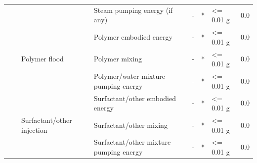 \documentclass[11pt]{report}
\begin{document}
\begin{landscape}
\begin{table}
\begin{scriptsize}
\begin{tabular}{|p{}|p{}|p{}|p{}|p{}|p{}|p{}|p{}|}
\cline{4-8}
& & & Steam pumping energy (if any) & - & * & <= 0.01 g & 0.0\\
\cline{3-8}
& & \multirow{3}{*}{Polymer flood} & Polymer embodied energy & - & * & <= 0.01 g & 0.0\\
\cline{4-8}
& & & Polymer mixing & - & * & <= 0.01 g & 0.0\\
\cline{4-8}
& & & Polymer/water mixture pumping energy & - & * & <= 0.01 g & 0.0\\
\cline{3-8}
& & \multirow{3}{0.12\columnwidth}{Surfactant/other injection} & Surfactant/other embodied energy & - & * & <= 0.01 g & 0.0\\
\cline{4-8}
& & & Surfactant/other mixing & - & * & <= 0.01 g & 0.0\\
\cline{4-8}
& & & Surfactant/other mixture pumping energy & - & * & <= 0.01 g & 0.0\\
\hline
\end{tabular}
\end{scriptsize}
\end{table}



\end{landscape}
\end{document}
